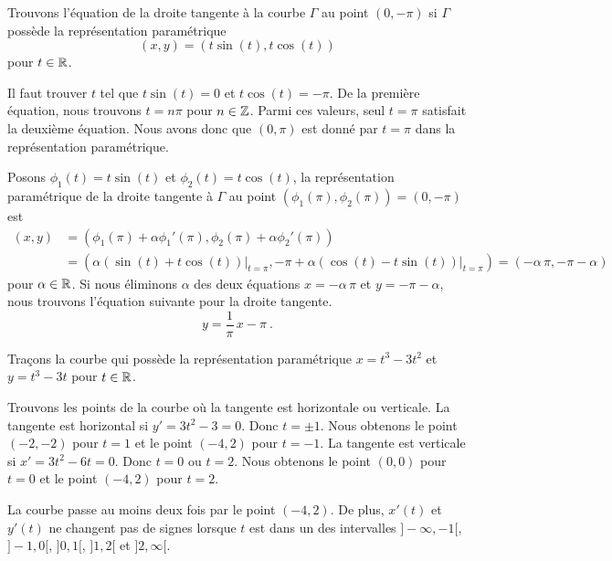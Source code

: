 { 

\begin{egg}
Trouvons l'équation de la droite tangente à la courbe $\Gamma$ au point
$(0,-\pi)$ si $\Gamma$ possède la représentation paramétrique
\[
(x,y) = (t\sin(t), t \cos(t))
\]
pour $t\in \mathbb{R}$.

Il faut trouver $t$ tel que $t\sin(t) = 0$ et $t\cos(t) = -\pi$.  De
la première équation, nous trouvons $t=n\pi$ pour $n \in \mathbb{Z}$.  Parmi ces
valeurs, seul $t=\pi$ satisfait la deuxième équation.  Nous avons donc que
$(0,\pi)$ est donné par $t=\pi$ dans la représentation paramétrique.

Posons $\phi_1(t) = t\sin(t)$ et $\phi_2(t) = t\cos(t)$, la
représentation paramétrique de la droite tangente à $\Gamma$ au point
$(\phi_1(\pi),\phi_2(\pi)) = (0 , -\pi)$ est
\begin{align*}
(x,y) &= \left(\phi_1(\pi)+\alpha\phi_1'(\pi),
\phi_2(\pi)+\alpha\phi_2'(\pi) \right) \\
&= \left( \alpha\left( \sin(t) + t\cos(t) \right)\big|_{t=\pi} , -\pi +
\alpha\left(\cos(t) - t \sin(t)\right)\big|_{t=\pi} \right)
= (-\alpha\,\pi , -\pi - \alpha)
\end{align*}
pour $\alpha \in \mathbb{R}$.  Si nous éliminons $\alpha$ des deux équations
$x=-\alpha\,\pi$ et $y= -\pi - \alpha$, nous trouvons l'équation suivante
pour la droite tangente.
\[
y = \frac{1}{\pi}\,x - \pi \ .
\]
\end{egg}

\begin{egg}[\theory]
Traçons la courbe qui possède la représentation paramétrique
$x = t^3 - 3 t^2$ et $y = t^3-3t$ pour $t \in \mathbb{R}$.

Trouvons les points de la courbe où la tangente est
horizontale ou verticale.  La tangente est horizontal si
$y'= 3t^2-3=0$.  Donc $t=\pm 1$.  Nous obtenons le point
$(-2,-2)$ pour $t=1$ et le point $(-4,2)$ pour $t=-1$.
La tangente est verticale si $x'= 3t^2 -6t =0$.  Donc $t=0$ ou
$t=2$.  Nous obtenons le point $(0,0)$ pour $t=0$ et le point $(-4,2)$
pour $t=2$.

La courbe passe au moins deux fois par le point $(-4,2)$.  De
plus, $x'(t)$ et $y'(t)$ ne changent pas de signes lorsque $t$ est dans un
des intervalles $]-\infty, -1[$, $]-1,0[$, $]0,1[$, $]1,2[$ et
$]2,\infty[$.


\end{egg}}
